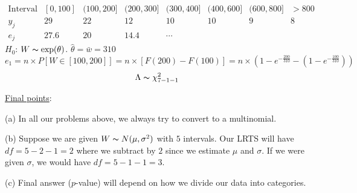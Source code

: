 \begin{exbox}
    \begin{example}[Exponential]
        \[
            \begin{array}{cccccccc}
                \text{Interval} & [0,100] & (100,200] & (200,300] & (300,400] & (400,600] & (600,800] & >800 \\
                y_j             & 29      & 22        & 12        & 10        & 10        & 9         & 8    \\
                e_j             & 27.6    & 20        & 14.4      & \cdots
            \end{array}
        \]
        $ H_0 $: $ W \thicksim \exp(\theta) $. $ \hat{\theta}=\bar{w}=310 $
        \[ e_1=n\times P\left[ W\in[100,200] \right]=n\times \left[ F(200)-F(100) \right]=
            n\times\left( 1-e^{-\frac{200}{310}}-\left( 1-e^{-\frac{100}{310}} \right) \right) \]
        \[ \Lambda \thicksim \chi^2_{7-1-1} \]
    \end{example}
\end{exbox}
\underline{Final points}:

(a) In all our problems above, we always try to convert to a multinomial.

(b) Suppose we are given $ W \thicksim N(\mu,\sigma^2) $ with $ 5 $ intervals.
Our LRTS will have $ df=5-2-1=2 $ where we subtract by $ 2 $ since we estimate $ \mu $ and $ \sigma $.
If we were given $ \sigma $, we would have $ df=5-1-1=3 $.

(c) Final answer ($ p $-value) will depend on how we divide our data into categories.
